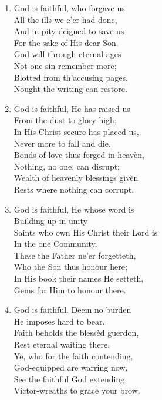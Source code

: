 \documentclass[11pt,a4paper]{article}
\begin{document}
\begin{enumerate}
    \item God is faithful, who forgave us \\
        All the ills we e'er had done, \\
        And in pity deigned to save us \\
        For the sake of His dear Son. \\
        God will through eternal ages \\
        Not one sin remember more; \\
        Blotted from th'accusing pages, \\
        Nought the writing can restore.

    \item God is faithful, He has raised us \\
        From the dust to glory high; \\
        In His Christ secure has placed us, \\
        Never more to fall and die. \\
        Bonds of love thus forged in heav\`en, \\
        Nothing, no one, can disrupt; \\
        Wealth of heavenly blessings giv\`en \\
        Rests where nothing can corrupt.

    \item God is faithful, He whose word is \\
        Building up in unity \\
        Saints who own His Christ their Lord is \\
        In the one Community. \\
        These the Father ne'er forgetteth, \\
        Who the Son thus honour here; \\
        In His book their names He setteth, \\
        Gems for Him to honour there.

    \item God is faithful. Deem no burden \\
        He imposes hard to bear. \\
        Faith beholds the bless\`ed guerdon, \\
        Rest eternal waiting there. \\
        Ye, who for the faith contending, \\
        God-equipped are warring now, \\
        See the faithful God extending \\
        Victor-wreaths to grace your brow.


\end{enumerate}
\end{document}
